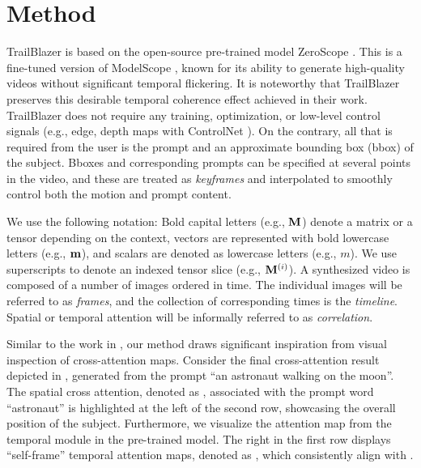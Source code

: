 \section{Method}


\label{sec:method}

TrailBlazer is based on the open-source pre-trained model ZeroScope \cite{zeroscope}. This is a fine-tuned version of ModelScope \cite{luo2023videofusion}, known for its ability to generate high-quality videos without significant temporal flickering. It is noteworthy that TrailBlazer preserves this desirable temporal coherence effect achieved in their work.  TrailBlazer does not require any training, optimization, or low-level control signals (e.g., edge, depth maps with ControlNet \cite{controlnet}).  On the contrary, all that is required from the user is the prompt and an approximate bounding box (bbox) of the subject. Bboxes and corresponding prompts can be specified at several points in the video, and these are treated as \emph{keyframes} and interpolated to smoothly control both the motion and prompt content. 

We use the following notation: Bold capital letters (e.g., $\mathbf{M}$) denote a matrix or a tensor depending on the context, vectors are represented with bold lowercase letters (e.g., $\mathbf{m}$), and  scalars are denoted as lowercase letters (e.g., $m$). We use superscripts to denote an indexed tensor slice (e.g., $\mathbf{M}^{(i)}$).  A synthesized video is composed of a number of images ordered in time. The individual images will be referred to as \emph{frames}, and the collection of corresponding times is the \emph{timeline}.
Spatial or temporal attention will be informally referred to as \emph{correlation}.

Similar to the work in \cite{ma2023directed}, our method draws significant inspiration from visual inspection of cross-attention maps. Consider
the final cross-attention result depicted in , generated from the prompt ``an astronaut walking on the moon''. The spatial cross attention, denoted as \SAttn, associated with the prompt word ``astronaut'' is highlighted at the left of the second row, showcasing the overall position of the subject. Furthermore, we visualize the attention map from the temporal module in the pre-trained model. The right in the first row displays ``self-frame'' temporal attention maps, denoted as \TAttnSelf, which consistently align with \SAttn.

